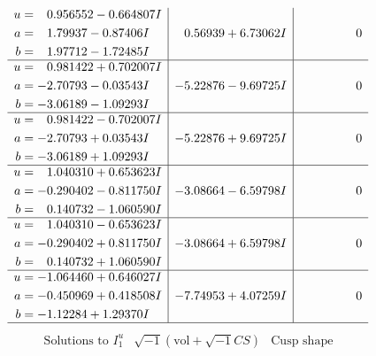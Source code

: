 \documentclass[1p]{elsarticle_modified}
\theoremstyle{definition}
\newcommand{\I}{\sqrt{-1}}
\begin{document}
$$\begin{array}{c|c|c}
\begin{aligned}
u &= \phantom{-}0.956552 - 0.664807 I \\
a &= \phantom{-}1.79937 - 0.87406 I \\
b &= \phantom{-}1.97712 - 1.72485 I\end{aligned}
 & \phantom{-}0.56939 + 6.73062 I & \phantom{-0.000000 } 0 \\ \hline\begin{aligned}
u &= \phantom{-}0.981422 + 0.702007 I \\
a &= -2.70793 - 0.03543 I \\
b &= -3.06189 - 1.09293 I\end{aligned}
 & -5.22876 - 9.69725 I & \phantom{-0.000000 } 0 \\ \hline\begin{aligned}
u &= \phantom{-}0.981422 - 0.702007 I \\
a &= -2.70793 + 0.03543 I \\
b &= -3.06189 + 1.09293 I\end{aligned}
 & -5.22876 + 9.69725 I & \phantom{-0.000000 } 0 \\ \hline\begin{aligned}
u &= \phantom{-}1.040310 + 0.653623 I \\
a &= -0.290402 - 0.811750 I \\
b &= \phantom{-}0.140732 - 1.060590 I\end{aligned}
 & -3.08664 - 6.59798 I & \phantom{-0.000000 } 0 \\ \hline\begin{aligned}
u &= \phantom{-}1.040310 - 0.653623 I \\
a &= -0.290402 + 0.811750 I \\
b &= \phantom{-}0.140732 + 1.060590 I\end{aligned}
 & -3.08664 + 6.59798 I & \phantom{-0.000000 } 0 \\ \hline\begin{aligned}
u &= -1.064460 + 0.646027 I \\
a &= -0.450969 + 0.418508 I \\
b &= -1.12284 + 1.29370 I\end{aligned}
 & -7.74953 + 4.07259 I & \phantom{-0.000000 } 0\\
 \hline 
 \end{array}$$\newpage$$\begin{array}{c|c|c}  
\text{Solutions to }I^u_{1}& \I (\text{vol} + \sqrt{-1}CS) & \text{Cusp shape}\\
 \hline 
\begin{aligned}

\end{aligned}
\end{array}$$
\end{document}
